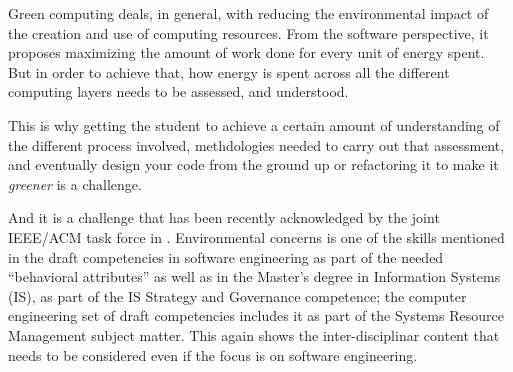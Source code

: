 \documentclass[sigconf]{acmart}
\begin{document}
Green computing \cite{kurp2008green} deals, in general, with reducing the
environmental impact of the creation and use of computing resources. From the
software perspective, it proposes maximizing the amount of work done for every
unit of energy spent. But in order to achieve that, how energy is spent across
all the different computing layers needs to be assessed, and understood.

This is why getting the student to achieve a certain amount of understanding of
the different process involved, methdologies needed to carry out that
assessment, and eventually design your code from the ground up or refactoring it
to make it {\em greener} is a challenge.

And it is a challenge that has been recently acknowledged by the joint IEEE/ACM
task force in \cite{cc2020}. Environmental concerns is one of the skills
mentioned in the draft competencies in software engineering as part of the
needed ``behavioral attributes'' as well as in the
Master's degree in Information Systems (IS), as part of the IS Strategy and
Governance competence; the computer engineering set of draft competencies
includes it as part of the Systems Resource Management subject matter. This
again shows the inter-disciplinar content that needs to be considered even if
the focus is on software engineering.
\end{document}
